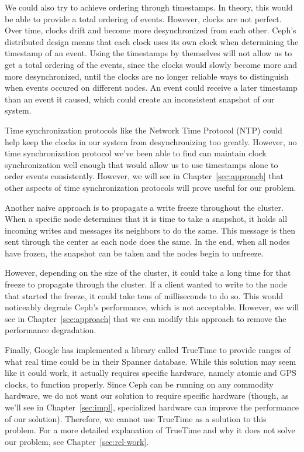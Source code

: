 We could also try to achieve ordering through timestamps. In theory,
this would be able to provide a total ordering of events. However,
clocks are not perfect. Over time, clocks drift and become more
desynchronized from each other. Ceph's distributed design means that
each clock uses its own clock when determining the timestamp of an
event. Using the timestamps by themselves will not allow us to get a
total ordering of the events, since the clocks would slowly become
more and more desynchronized, until the clocks are no longer reliable
ways to distinguish when events occured on different nodes. An event
could receive a later timestamp than an event it caused, which could
create an inconsistent snapshot of our system.

Time synchronization protocols like the Network Time Protocol (NTP)
could help keep the clocks in our system from desynchronizing too
greatly. However, no time synchronization protocol we've been able to
find can maintain clock synchronization well enough that would allow
us to use timestamps alone to order events consistently. However, we
will see in Chapter~\ref{sec:approach} that other aspects of time
synchronization protocols will prove useful for our problem.

Another naive approach is to propagate a write freeze throughout the
cluster.  When a specific node determines that it is time to take a
snapshot, it holds all incoming writes and messages its neighbors to
do the same. This message is then sent through the center as each node
does the same. In the end, when all nodes have frozen, the snapshot
can be taken and the nodes begin to unfreeze.

However, depending on the size of the cluster, it could take a long
time for that freeze to propagate through the cluster. If a client
wanted to write to the node that started the freeze, it could take
tens of milliseconds to do so.  This would noticeably degrade Ceph's
performance, which is not acceptable.  However, we will see in
Chapter~\ref{sec:approach} that we can modify this approach to remove
the performance degradation.

Finally, Google has implemented a library called TrueTime to provide
ranges of what real time could be in their Spanner database. While
this solution may seem like it could work, it actually requires
specific hardware, namely atomic and GPS clocks, to function
properly. Since Ceph can be running on any commodity hardware, we do
not want our solution to require specific hardware (though, as we'll
see in Chapter~\ref{sec:impl}, specialized hardware can improve the
performance of our solution). Therefore, we cannot use TrueTime as a
solution to this problem. For a more detailed explanation of TrueTime
and why it does not solve our problem, see Chapter~\ref{sec:rel-work}.














